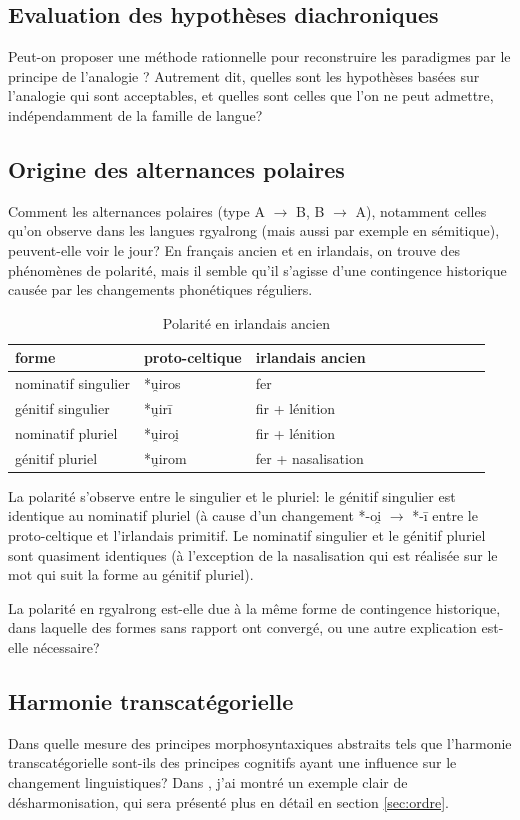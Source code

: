 \documentclass[oldfontcommands,oneside,a4paper,11pt]{memoir}
\begin{document}
\subsection{Evaluation des hypothèses diachroniques}
  Peut-on proposer une méthode rationnelle pour reconstruire les paradigmes par le principe de l'analogie ? Autrement dit, quelles sont les hypothèses basées sur l'analogie qui sont acceptables, et quelles sont celles que l'on ne peut admettre, indépendamment  de la famille de langue?
\subsection{Origine des alternances polaires}
  Comment les alternances polaires (type A $\rightarrow$ B, B $\rightarrow$ A), notamment celles qu'on observe dans les langues rgyalrong (mais aussi par exemple en sémitique), peuvent-elle voir le jour? En français ancien et en irlandais, on trouve des phénomènes de polarité, mais il semble qu'il s'agisse d'une contingence historique causée par les changements phonétiques réguliers. 
\begin{table}[H]
\caption{Polarité en irlandais ancien}  \centering
\begin{tabular}{lllllllllll}  \toprule  
forme & proto-celtique & irlandais ancien \\
\midrule
nominatif singulier & *u̯iros & fer \\
génitif singulier & *u̯irī & fir + lénition \\
nominatif pluriel & *u̯iroi̯ & fir + lénition \\
génitif pluriel & *u̯irom & fer + nasalisation \\
\bottomrule
\end{tabular}
\end{table}
La polarité s'observe entre le singulier et le pluriel: le génitif singulier est identique au nominatif pluriel (à cause d'un changement *-oi̯ $\rightarrow $ *-ī entre le proto-celtique et l'irlandais primitif. Le nominatif singulier et le génitif pluriel sont quasiment identiques (à l'exception de la nasalisation qui est réalisée sur le mot qui suit la forme au génitif pluriel). 

La polarité en rgyalrong est-elle due à la même forme de contingence historique, dans laquelle des formes sans rapport ont convergé, ou une autre explication est-elle nécessaire?
\subsection{Harmonie transcatégorielle}
  Dans quelle mesure des principes morphosyntaxiques abstraits tels que l'harmonie transcatégorielle sont-ils des principes cognitifs ayant une influence sur le changement linguistiques? Dans \citet{jacques13harmonization}, j'ai montré un exemple clair de désharmonisation, qui sera présenté plus en détail en section \ref{sec:ordre}.
 
\end{document}
